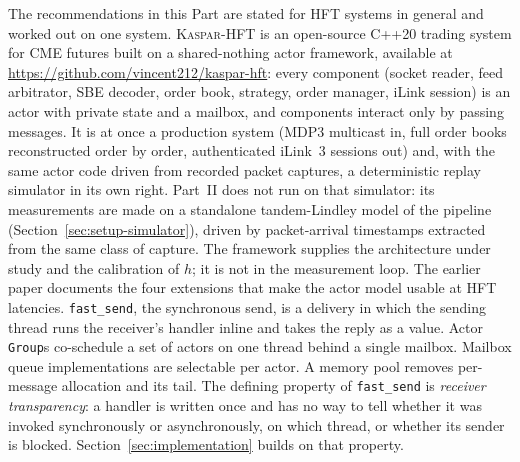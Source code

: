 \documentclass[11pt]{article}
\newcommand{\kasparhft}{\textsc{Kaspar-HFT}}
\begin{document}
The recommendations in this Part are stated for HFT systems in general and worked out
on one system.
\kasparhft{} \citep{kaspar_repo,mayeski_fastsend} is an open-source C++20
trading system for CME futures built on a shared-nothing actor framework, available at
\url{https://github.com/vincent212/kaspar-hft}: every component (socket reader, feed
arbitrator, SBE decoder, order book, strategy, order manager, iLink session) is an actor
with private state and a mailbox, and components interact only by passing messages. It is
at once a production system (MDP3 multicast in, full order books reconstructed order by
order, authenticated iLink~3 sessions out) and, with the same actor code driven from recorded
packet captures, a deterministic replay simulator in its own right. Part~II does not run
on that simulator: its measurements are made on a standalone tandem-Lindley model of the
pipeline (Section~\ref{sec:setup-simulator}), driven by packet-arrival timestamps
extracted from the same class of capture. The framework supplies the architecture under
study and the calibration of $h$; it is not in the measurement loop. The earlier paper
\citep{mayeski_fastsend} documents the four extensions that make the actor model usable
at HFT latencies. \texttt{fast\_send}, the synchronous send, is a delivery in which the
sending thread runs the receiver's handler inline and takes the reply as a value. Actor
\texttt{Group}s co-schedule a set of actors on one thread behind a single mailbox. Mailbox
queue implementations are selectable per actor. A memory pool removes per-message
allocation and its tail. The defining property of \texttt{fast\_send} is
\emph{receiver transparency}: a handler is written once and has no way to tell whether it
was invoked synchronously or asynchronously, on which thread, or whether its sender is
blocked. Section~\ref{sec:implementation} builds on that property.
\end{document}
